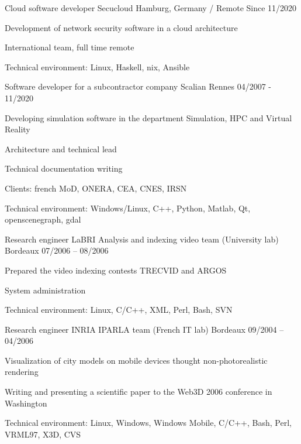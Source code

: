 \begin{cventries}
  \cventry
    { Cloud software developer}
    {Secucloud}
    {Hamburg, Germany / Remote}
    {Since 11/2020}
    {
      \begin{cvitems}
        \item {Development of network security software in a cloud architecture}
        \item {International team, full time remote}
        \item {Technical environment: Linux, Haskell, nix, Ansible}
      \end{cvitems}
    }

  \cventry
    {Software developer for a subcontractor company}
    {Scalian}
    {Rennes}
    {04/2007 - 11/2020}
    {
      \begin{cvitems}
        \item {Developing simulation software in the department Simulation, HPC
            and Virtual Reality}
        \item {Architecture and technical lead}
        \item {Technical documentation writing}
        \item {Clients: french MoD, ONERA, CEA, CNES, IRSN}
        \item {Technical environment: Windows/Linux, C++, Python, Matlab, Qt,
            openscenegraph, gdal}
      \end{cvitems}
    }

  \cventry
    {Research engineer}
    {LaBRI Analysis and indexing video team (University lab)}
    {Bordeaux}
    {07/2006 – 08/2006}
    {
      \begin{cvitems}
        \item {Prepared the video indexing contests TRECVID and ARGOS}
        \item {System administration}
        \item {Technical environment: Linux, C/C++, XML, Perl, Bash, SVN}
      \end{cvitems}
    }

  \cventry
    {Research engineer}
    {INRIA IPARLA team (French IT lab)}
    {Bordeaux}
    {09/2004 – 04/2006}
    {
      \begin{cvitems}
        \item {Visualization of city models on mobile devices thought
            non-photorealistic rendering}
        \item {Writing and presenting a scientific paper to the Web3D 2006
            conference in Washington}
        \item {Technical environment: Linux, Windows, Windows Mobile, C/C++,
            Bash, Perl, VRML97, X3D, CVS}
      \end{cvitems}
    }


\end{cventries}
